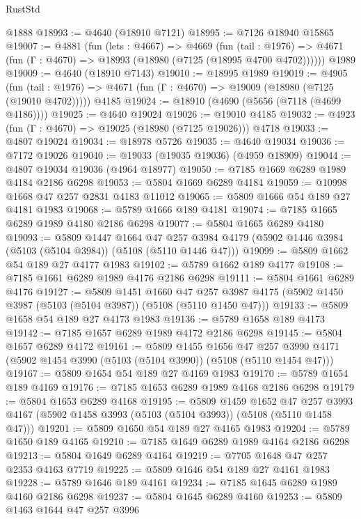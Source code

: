 \begin{lexlean}{RustStd}
\begin{coremodule}
    @1888
@18993 := @4640 (@18910 @7121)
@18995 := @7126 @18940 @15865
@19007 := @4881
    (fun (lets : @4667) =>
    @4669
      (fun (tail : @1976) =>
      @4671 (fun (Γ : @4670) => @18993 (@18980 (@7125 (@18995 @4700 @4702))))))
    @1989
@19009 := @4640 (@18910 @7143)
@19010 := @18995 @1989
@19019 := @4905
    (fun (tail : @1976) => @4671 (fun (Γ : @4670) => @19009 (@18980 (@7125 (@19010 @4702)))))
    @4185
@19024 := @18910 (@4690 (@5656 (@7118 (@4699 @4186))))
@19025 := @4640 @19024
@19026 := @19010 @4185
@19032 := @4923 (fun (Γ : @4670) => @19025 (@18980 (@7125 @19026))) @4718
@19033 := @4807 @19024
@19034 := @18978 @5726
@19035 := @4640 @19034
@19036 := @7172 @19026
@19040 := @19033 (@19035 @19036) (@4959 @18909)
@19044 := @4807 @19034 @19036 (@4964 @18977)
@19050 := @7185 @1669 @6289 @1989 @4184 @2186 @6298
@19053 := @5804 @1669 @6289 @4184
@19059 := @10998 @1668 @47 @257 @2831 @4183 @11012
@19065 := @5809 @1666 @54 @189 @27 @4181 @1983
@19068 := @5789 @1666 @189 @4181
@19074 := @7185 @1665 @6289 @1989 @4180 @2186 @6298
@19077 := @5804 @1665 @6289 @4180
@19093 := @5809
    @1447
    @1664
    @47
    @257
    @3984
    @4179
    (@5902 @1446 @3984 (@5103 (@5104 @3984)) (@5108 (@5110 @1446 @47)))
@19099 := @5809 @1662 @54 @189 @27 @4177 @1983
@19102 := @5789 @1662 @189 @4177
@19108 := @7185 @1661 @6289 @1989 @4176 @2186 @6298
@19111 := @5804 @1661 @6289 @4176
@19127 := @5809
    @1451
    @1660
    @47
    @257
    @3987
    @4175
    (@5902 @1450 @3987 (@5103 (@5104 @3987)) (@5108 (@5110 @1450 @47)))
@19133 := @5809 @1658 @54 @189 @27 @4173 @1983
@19136 := @5789 @1658 @189 @4173
@19142 := @7185 @1657 @6289 @1989 @4172 @2186 @6298
@19145 := @5804 @1657 @6289 @4172
@19161 := @5809
    @1455
    @1656
    @47
    @257
    @3990
    @4171
    (@5902 @1454 @3990 (@5103 (@5104 @3990)) (@5108 (@5110 @1454 @47)))
@19167 := @5809 @1654 @54 @189 @27 @4169 @1983
@19170 := @5789 @1654 @189 @4169
@19176 := @7185 @1653 @6289 @1989 @4168 @2186 @6298
@19179 := @5804 @1653 @6289 @4168
@19195 := @5809
    @1459
    @1652
    @47
    @257
    @3993
    @4167
    (@5902 @1458 @3993 (@5103 (@5104 @3993)) (@5108 (@5110 @1458 @47)))
@19201 := @5809 @1650 @54 @189 @27 @4165 @1983
@19204 := @5789 @1650 @189 @4165
@19210 := @7185 @1649 @6289 @1989 @4164 @2186 @6298
@19213 := @5804 @1649 @6289 @4164
@19219 := @7705 @1648 @47 @257 @2353 @4163 @7719
@19225 := @5809 @1646 @54 @189 @27 @4161 @1983
@19228 := @5789 @1646 @189 @4161
@19234 := @7185 @1645 @6289 @1989 @4160 @2186 @6298
@19237 := @5804 @1645 @6289 @4160
@19253 := @5809
    @1463
    @1644
    @47
    @257
    @3996

\end{coremodule}
\end{lexlean}
